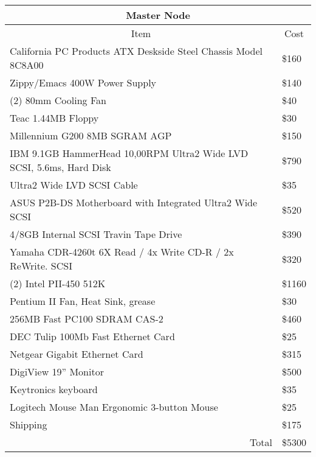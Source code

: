 \bigskip%

\begin{tabular}
[c]{|c|c|}\hline\hline
\multicolumn{2}{|c|}{Master Node}\\\hline\hline
Item & Cost\\\cline{1-1}%
\multicolumn{1}{|l|}{California PC Products ATX Deskside Steel Chassis Model
8C8A00} & \multicolumn{1}{|l|}{\$160}\\\cline{1-1}%
\multicolumn{1}{|l|}{Zippy/Emacs 400W Power Supply} &
\multicolumn{1}{|l|}{\$140}\\\cline{1-1}%
\multicolumn{1}{|l|}{(2) 80mm Cooling Fan} & \multicolumn{1}{|l|}{\$40}%
\\\cline{1-1}%
\multicolumn{1}{|l|}{Teac 1.44MB Floppy} & \multicolumn{1}{|l|}{\$30}%
\\\cline{1-1}%
\multicolumn{1}{|l|}{Millennium G200 8MB SGRAM AGP} &
\multicolumn{1}{|l|}{\$150}\\\cline{1-1}%
\multicolumn{1}{|l|}{IBM 9.1GB HammerHead 10,00RPM Ultra2 Wide LVD SCSI,
5.6ms, Hard Disk} & \multicolumn{1}{|l|}{\$790}\\\cline{1-1}%
\multicolumn{1}{|l|}{Ultra2 Wide LVD SCSI Cable} & \multicolumn{1}{|l|}{\$35}%
\\\cline{1-1}%
\multicolumn{1}{|l|}{ASUS P2B-DS Motherboard with Integrated Ultra2 Wide SCSI}%
& \multicolumn{1}{|l|}{\$520}\\\cline{1-1}%
\multicolumn{1}{|l|}{4/8GB Internal SCSI Travin Tape Drive} &
\multicolumn{1}{|l|}{\$390}\\\cline{1-1}%
\multicolumn{1}{|l|}{Yamaha CDR-4260t 6X Read / 4x Write CD-R / 2x ReWrite.
SCSI} & \multicolumn{1}{|l|}{\$320}\\\cline{1-1}%
\multicolumn{1}{|l|}{(2) Intel PII-450 512K} & \multicolumn{1}{|l|}{\$1160}%
\\\cline{1-1}%
\multicolumn{1}{|l|}{Pentium II Fan, Heat Sink, grease} &
\multicolumn{1}{|l|}{\$30}\\\hline
\multicolumn{1}{|l|}{256MB Fast PC100 SDRAM CAS-2} &
\multicolumn{1}{|l|}{\$460}\\\hline
\multicolumn{1}{|l|}{DEC Tulip 100Mb Fast Ethernet Card} &
\multicolumn{1}{|l|}{\$25}\\\hline
\multicolumn{1}{|l|}{Netgear Gigabit Ethernet Card} &
\multicolumn{1}{|l|}{\$315}\\\hline
\multicolumn{1}{|l|}{DigiView 19'' Monitor} & \multicolumn{1}{|l|}{\$500}%
\\\hline
\multicolumn{1}{|l|}{Keytronics keyboard} & \multicolumn{1}{|l|}{\$35}\\\hline
\multicolumn{1}{|l|}{Logitech Mouse Man Ergonomic 3-button Mouse} &
\multicolumn{1}{|l|}{\$25}\\\hline
\multicolumn{1}{|l|}{Shipping} & \multicolumn{1}{|l|}{\$175}\\\hline
\multicolumn{1}{|r|}{Total} & \multicolumn{1}{|l|}{\$5300}\\\hline
\end{tabular}

